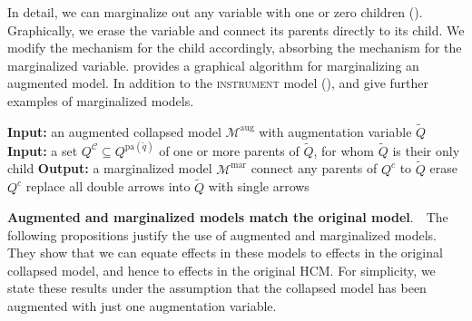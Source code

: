 \documentclass[12pt]{article}
\newcommand{\pa}{\mathrm{pa}}
\newcommand{\aug}{\mathrm{aug}}
\newcommand{\mar}{\mathrm{mar}}
\newcommand{\Mc}{\mathcal{M}}
\newcommand{\parhead}[1]{\vspace{0.1in} \noindent \textbf{#1}. \,\,}
\begin{document}
In detail, we can marginalize out any variable with one or zero children
().
Graphically, we erase the variable and
connect its parents directly to its child. We modify the mechanism for the child accordingly, absorbing the mechanism for the marginalized variable.
 provides a graphical algorithm for marginalizing an augmented model.
In addition to the \textsc{instrument} model (),  and  give further examples of marginalized models.

\begin{algorithm}[t]
	\caption{\textbf{Graphical algorithm for marginalizing an augmented model.} This algorithm marginalizes out parent(s) of an augmentation variable ().} \label{alg:marginalize}
\begin{algorithmic}
\State \textbf{Input:} an augmented collapsed model $\Mc^\aug$ with augmentation variable $\tilde Q$
\State \textbf{Input:} a set $Q^\mathcal{C} \subseteq Q^{\pa(\tilde{q})}$ of one or more parents of $\tilde Q$, for whom $\tilde Q$ is their only child
\State \textbf{Output:} a marginalized model $\Mc^\mar$
\State connect any parents of $Q^c$ to $\tilde{Q}$
\State erase $Q^c$
\EndFor
\State replace all double arrows into $\tilde Q$ with single arrows
\end{algorithmic}
\end{algorithm}

\parhead{Augmented and marginalized models match the original model} \label{sec:augment_marg_matches} The following propositions justify the use of augmented and marginalized models. They show that we can equate effects in these models to effects in the original collapsed model, and hence to effects in the original HCM.
For simplicity, we state these results under the assumption that the collapsed model has been augmented with just one augmentation variable. 
\end{document}
